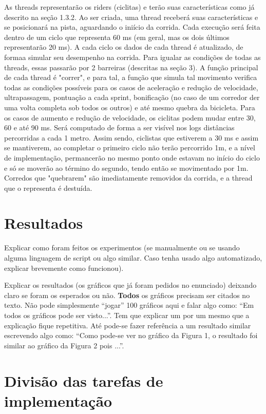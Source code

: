 \documentclass[12pt,a4paper]{article}
\begin{document}
    As threads representarão os riders (ciclitas) e terão suas características como já descrito na seção 1.3.2. Ao ser criada, uma thread receberá suas características e se posicionará na pista, aguardando o iniício da corrida. Cada execução será feita dentro de um ciclo que representa 60 ms (em geral, mas os dois últimos representarão 20 ms). A cada ciclo os dados de cada thread é atualizado, de formaa simular seu desempenho na corrida. Para igualar as condições de todas as threads, essas passarão por 2 barreiras (descritas na seção 3).
    A função principal de cada thread é "correr", e para tal, a função que simula tal movimento verifica todas as condições possíveis para os casos de aceleração e redução de velocidade, ultrapassagem, pontuação a cada sprint, bonificação (no caso de um corredor der uma volta completa sob todos os outros) e até mesmo quebra da bicicleta.
    Para os casos de aumento e redução de velocidade, os ciclitas podem mudar entre 30, 60 e até 90 ms. Será computado de forma a ser visível nos logs distâncias percorridas a cada 1 metro. Assim sendo, ciclistas que estiverem a 30 ms e assim se mantiverem, ao completar o primeiro ciclo não terão percorrido 1m, e a nível de implementação, permancerão no mesmo ponto onde estavam no início do ciclo e só se moverão ao término do segundo, tendo então se movimentado por 1m.
    Corredos que "quebrarem" são imediatamente removidos da corrida, e a thread que o representa é destuída.


\section{Resultados}

Explicar como foram feitos os experimentos (se manualmente ou se
usando alguma linguagem de script ou algo similar. Caso tenha usado
algo automatizado, explicar brevemente como funcionou).

Explicar os resultados (os gráficos que já foram pedidos no
enunciado) deixando claro se foram os esperados ou não. \textbf{Todos}
os gráficos precisam ser citados no texto. Não pode simplesmente
``jogar'' 100 gráficos aqui e falar algo como: ``Em todos os gráficos
pode ser visto...''. Tem que explicar um por um mesmo que a explicação
fique repetitiva. Até pode-se fazer referência a um resultado similar
escrevendo algo como: ``Como pode-se ver no gráfico da Figura 1, o
resultado foi similar ao gráfico da Figura 2 pois ...''.

\section{Divisão das tarefas de implementação}
\end{document}
